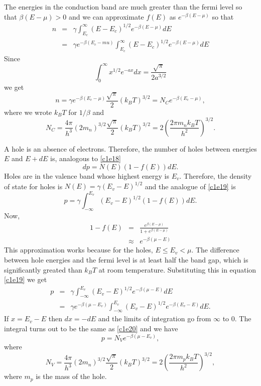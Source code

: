 The energies in the conduction band are much greater than the fermi level so
that $\beta(E-\mu) > 0$ and we can approximate $f(E)$ as $e^{-\beta(E-\mu)}$
so that
\begin{eqnarray*}
n &=& \gamma\int_{E_c}^\infty (E - E_c)^{1/2}e^{-\beta(E - \mu)}dE \\
 &=& \gamma e^{-\beta(E_c - mu)} 
\int_{E_c}^\infty (E-E_c)^{1/2}e^{-\beta(E - \mu)}dE
\end{eqnarray*}
Since
\begin{equation}\label{c1e20}
\int_0^\infty x^{1/2}e^{-ax}dx = \frac{\sqrt{\pi}}{2a^{3/2}}
\end{equation}
we get
\begin{equation}\label{c1e21}
n =\gamma e^{-\beta(E_c - \mu)} \frac{\sqrt{\pi}}{2}(k_BT)^{3/2}
= N_Ce^{-\beta(E_c - \mu)},
\end{equation}
where we wrote $k_BT$ for $1/\beta$ and
\begin{equation}\label{c1e22}
N_C = \frac{4\pi}{h^3}(2m_n)^{3/2} \frac{\sqrt{\pi}}{2}(k_BT)^{3/2} = 
2\left(\frac{2\pi m_nk_BT}{h^2}\right)^{3/2}.
\end{equation}

A hole is an absence of electrons. Therefore, the number of holes between
energies $E$ and $E + dE$ is, analogous to \eqref{c1e18}
\begin{equation}\label{c1e23}
dp = N(E)(1 - f(E))dE.
\end{equation}
Holes are in the valence band whose highest energy is $E_v$. Therefore, the
density of state for holes is $N(E) = \gamma(E_v - E)^{1/2}$ and the analogue
of \eqref{c1e19} is
\begin{equation}\label{c1e24}
p = \gamma\int_{-\infty}^{E_v}(E_v - E)^{1/2}(1 - f(E))dE.
\end{equation}
Now,
\begin{eqnarray*}
1 - f(E) &=& \frac{e^{\beta(E - \mu)}}{1 + e^{\beta(E - \mu)}} \\
&\approx& e^{-\beta(\mu - E)}
\end{eqnarray*}
This approximation works because for the holes, $E \le E_v < \mu$. The 
difference between hole energies and the fermi level is at least half the band
gap, which is significantly greated than $k_BT$ at room temperature. 
Substituting this in equation \eqref{c1e19} we get
\begin{eqnarray*}
p &=& \gamma\int_{-\infty}^{E_v}(E_v - E)^{1/2}e^{-\beta(\mu - E)}dE \\
&=& \gamma e^{-\beta(\mu - E_v)}
\int_{-\infty}^{E_v} (E_v - E)^{1/2}e^{-\beta(E_v-E)}dE.
\end{eqnarray*}
If $x = E_v - E$ then $dx = -dE$ and the limits of integration go from $\infty$
to $0$. The integral turns out to be the same as \eqref{c1e20} and we have
\begin{equation}\label{c1e25}
p = N_V e^{-\beta(\mu - E_v)},
\end{equation}
where
\begin{equation}\label{c1e26}
N_V = \frac{4\pi}{h^3}(2m_n)^{3/2} \frac{\sqrt{\pi}}{2}(k_BT)^{3/2} = 
2\left(\frac{2\pi m_pk_BT}{h^2}\right)^{3/2},
\end{equation}
where $m_p$ is the mass of the hole.

